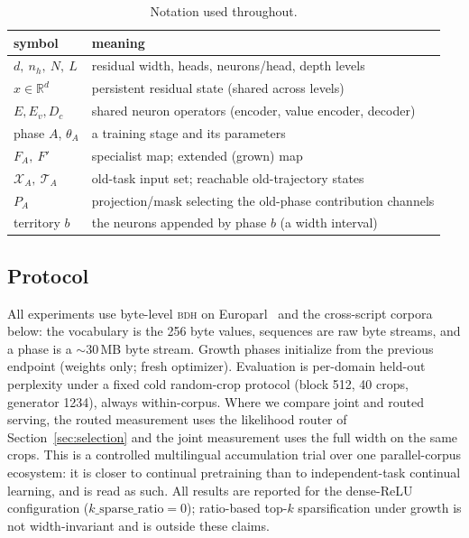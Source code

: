 \documentclass[11pt]{article}
\theoremstyle{definition}\newtheorem{definition}{Definition}
\theoremstyle{remark}\newtheorem{remark}{Remark}
\newcommand{\BDH}{\textsc{bdh}}
\newcommand{\Xa}{\mathcal{X}_A}
\newcommand{\TA}{\mathcal{T}_A}
\begin{document}
\begin{table}[t]
\centering\small
\caption{Notation used throughout.}
\label{tab:notation}
\begin{tabular}{ll}
\toprule
symbol & meaning \\
\midrule
$d,\ n_h,\ N,\ L$ & residual width, heads, neurons/head, depth levels \\
$x\in\mathbb{R}^{d}$ & persistent residual state (shared across levels) \\
$E,E_v,D_c$ & shared neuron operators (encoder, value encoder, decoder) \\
phase $A$, $\theta_A$ & a training stage and its parameters \\
$F_A,\ F'$ & specialist map; extended (grown) map \\
$\Xa,\ \TA$ & old-task input set; reachable old-trajectory states \\
$P_A$ & projection/mask selecting the old-phase contribution channels \\
territory $b$ & the neurons appended by phase $b$ (a width interval) \\
\bottomrule
\end{tabular}
\end{table}

\subsection{Protocol}
\label{sec:protocol}

All experiments use byte-level \BDH{} on Europarl~\cite{europarl} and the cross-script corpora below: the vocabulary is the 256 byte values, sequences are
raw byte streams, and a phase is a $\sim$30\,MB byte stream. Growth phases initialize from
the previous endpoint (weights only; fresh optimizer). Evaluation is per-domain held-out
perplexity under a fixed cold random-crop protocol (block 512, 40 crops, generator 1234),
always within-corpus. Where we compare joint and routed serving, the routed measurement uses
the likelihood router of Section~\ref{sec:selection} and the joint measurement uses the full
width on the same crops. This is a controlled multilingual accumulation trial over one parallel-corpus
ecosystem: it is closer to continual pretraining than to independent-task continual learning, and
is read as such. All results are reported for the dense-ReLU configuration
($k\_\mathrm{sparse\_ratio}=0$); ratio-based top-$k$ sparsification under growth is not width-invariant
and is outside these claims.
\end{document}
